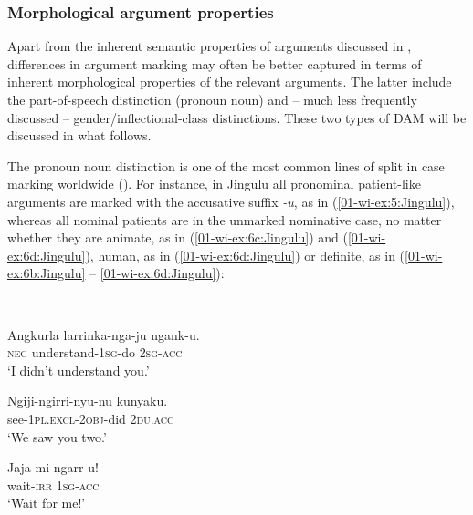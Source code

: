 \documentclass[output=paper]{LSP/langsci}
\begin{document}
\subsubsection{Morphological argument properties}
\label{01-wi-sec:2.1.2-Morphological}

Apart from the inherent semantic properties of arguments discussed in , differences in argument marking may often be better captured in terms of inherent morphological properties of the relevant arguments. 
The latter include the part-of-speech distinction (pronoun \vs noun) and – much less frequently discussed – gender/inflectional-class distinctions. 
These two types of DAM will be discussed in what follows.

The pronoun \vs noun distinction is one of the most common lines of split in case marking worldwide (\cf \citealt{Bickeletal2015Typological}). 
For instance, in Jingulu all pronominal patient-like arguments are marked with the accusative suffix \textit{-u}, as in (\ref{01-wi-ex:5:Jingulu}), whereas all nominal patients are in the unmarked nominative case, no matter whether they are animate, as in (\ref{01-wi-ex:6c:Jingulu}) and (\ref{01-wi-ex:6d:Jingulu}), human, as in (\ref{01-wi-ex:6d:Jingulu}) or definite, as in (\ref{01-wi-ex:6b:Jingulu} -- \ref{01-wi-ex:6d:Jingulu}):

\ea\label{01-wi-ex:5:Jingulu}
\\
\begin{xlist}

\ex\label{01-wi-ex:5a:Jingulu}
	\gll	Angkurla	larrinka-nga-ju	ngank-u.\\
	\textsc{neg}		understand-\textsc{1sg}-do	\textsc{2sg}-\textsc{acc}\\
	\glt	‘I didn't understand you.’ %

\ex\label{01-wi-ex:5b:Jingulu}
	\gll	Ngiji-ngirri-nyu-nu		kunyaku.\\
	see-\textsc{1pl.excl}-\textsc{2obj}-did	\textsc{2du.acc}\\
	\glt	‘We saw you two.’ %

\ex\label{01-wi-ex:5c:Jingulu}
	\gll	Jaja-mi	ngarr-u!	\\
	wait-\textsc{irr}	\textsc{1sg}-\textsc{acc}\\
	\glt	‘Wait for me!’ %
	
\end{xlist}
\z
\end{document}
